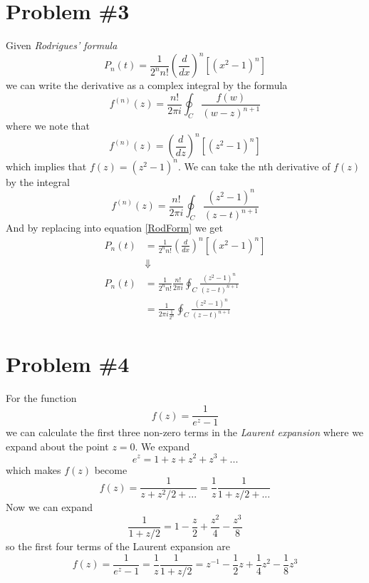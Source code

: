 \documentclass[11pt]{article}
\numberwithin{equation}{section}
\begin{document}
\pagebreak

\section{Problem \#3}
Given \emph{Rodrigues' formula} 
\begin{equation}
P_n(t) = \frac{1}{2^nn!}\left(\frac{d}{dx}\right)^n[(x^2-1)^n]
\label{RodForm}
\end{equation}
we can write the derivative as a complex integral by the formula
$$f^{(n)}(z) = \frac{n!}{2\pi{i}}\oint_{C}\frac{f(w)}{(w-z)^{n+1}}$$
where we note that
$$f^{(n)}(z) = \left(\frac{d}{dz}\right)^n[(z^2-1)^n]$$
which implies that $f(z) = (z^2-1)^n$. We can take the nth derivative of $f(z)$ by the 
integral
$$f^{(n)}(z) = \frac{n!}{2\pi{i}}\oint_{C}\frac{(z^2-1)^n}{(z-t)^{n+1}}$$
And by replacing into equation \ref{RodForm} we get
\begin{align*}
P_n(t) &= \frac{1}{2^nn!}\left(\frac{d}{dx}\right)^n[(x^2-1)^n]\\
&\Downarrow\\
P_n(t) &= \frac{1}{2^nn!}\frac{n!}{2\pi{i}}\oint_{C}\frac{(z^2-1)^n}{(z-t)^{n+1}}\\
&= \frac{1}{{2\pi{i}}\frac{1}{2^n}}\oint_{C}\frac{(z^2-1)^n}{(z-t)^{n+1}}
\end{align*}

\section{Problem \#4}
For the function 
$$f(z) = \frac{1}{e^z-1}$$
we can calculate the first three non-zero terms in the \emph{Laurent expansion} where we 
expand about the point $z=0$. We expand 
$$e^{z} = 1+z+z^2+z^3+...$$
which makes $f(z)$ become
$$f(z) = \frac{1}{z+z^2/2+...}=\frac{1}{z}\frac{1}{1+z/2+...}$$
Now we can expand 
$$\frac{1}{1+z/2} = 1 - \frac{z}{2} + \frac{z^2}{4} - \frac{z^3}{8}$$
so the first four terms of the Laurent expansion are
$$f(z) = \frac{1}{e^z-1} = \frac{1}{z}\frac{1}{1+z/2} = z^{-1} - \frac{1}{2}z + \frac{1}{4}z^2 - \frac{1}{8}z^3$$
\end{document}
